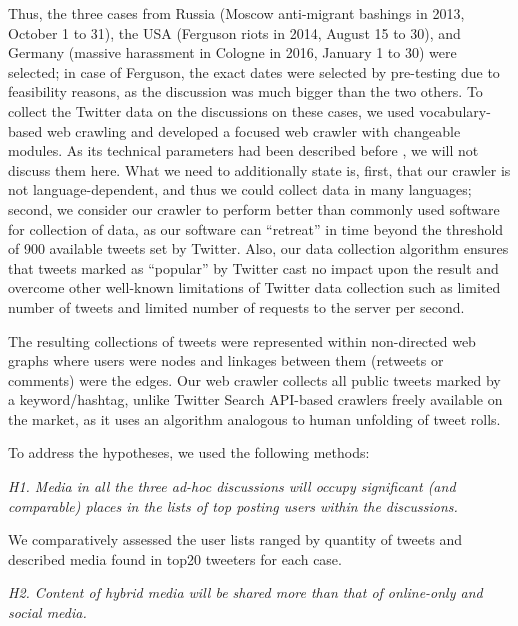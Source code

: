 Thus, the three cases from Russia (Moscow anti-migrant bashings in 2013, October 1 to 31), the USA (Ferguson riots in 2014, August 15 to 30), and Germany (massive harassment in Cologne in 2016, January 1 to 30) were selected; in case of Ferguson, the exact dates were selected by pre-testing due to feasibility reasons, as the discussion was much bigger than the two others. To collect the Twitter data on the discussions on these cases, we used vocabulary-based web crawling and developed a focused web crawler with changeable modules. As its technical parameters had been described before \cite{BlekanovSergeevMartynenko}, we will not discuss them here. What we need to additionally state is, first, that our crawler is not language-dependent, and thus we could collect data in many languages; second, we consider our crawler to perform better than commonly used software for collection of data, as our software can “retreat” in time beyond the threshold of 900 available tweets set by Twitter. Also, our data collection algorithm ensures that tweets marked as “popular” by Twitter cast no impact upon the result and overcome other well-known limitations of Twitter data collection such as limited number of tweets and limited number of requests to the server per second.

The resulting collections of tweets were represented within non-directed web graphs where users were nodes and linkages between them (retweets or comments) were the edges. Our web crawler collects all public tweets marked by a keyword/hashtag, unlike Twitter Search API-based crawlers freely available on the market, as it uses an algorithm analogous to human unfolding of tweet rolls.

To address the hypotheses, we used the following methods:

\textit{H1. Media in all the three ad-hoc discussions will occupy significant (and comparable) places in the lists of top posting users within the discussions.}

We comparatively assessed the user lists ranged by quantity of tweets and described media found in top20 tweeters for each case.

\textit{H2. Content of hybrid media will be shared more than that of online-only and social media.}

